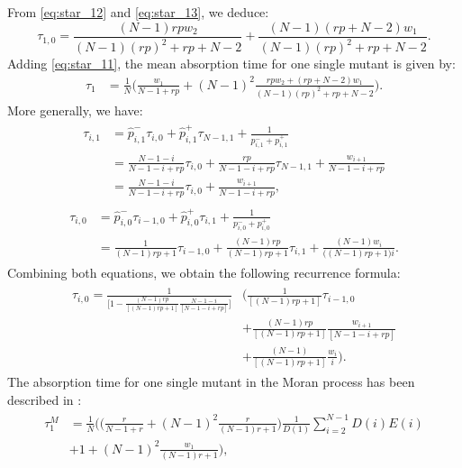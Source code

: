 \documentclass[a4paper,english,10pt]{amsart}
\theoremstyle{definition}
\numberwithin{equation}{section}
\begin{document}
%
From \eqref{eq:star_12} and \eqref{eq:star_13}, we deduce:
\[
  \tau_{1,0} = \frac{(N-1)rpw_2}{(N-1)(rp)^2 + rp + N-2} + \frac{(N-1)(rp+N-2)w_1}{(N-1)(rp)^2 + rp + N-2}.
\]
Adding \eqref{eq:star_11}, the mean absorption time for one single mutant is given by: 
\begin{align}
  \label{eq:ATstar}
 \tau_1 & = \frac{1}{N} \Big( \frac{w_1}{N-1+rp} + (N-1)^2 \frac{ rpw_2 + (rp+N-2)w_1}{(N-1)(rp)^2 + rp + N-2}\Big). 
\end{align}
More generally, we have: 
\begin{align} \label{eq:ATstar_i1}
\begin{split}
  \tau_{i,1} &= \hat p_{i,1}^- \tau_{i,0} 
                  + \hat p_{i,1}^+ \tau_{N-1,1} + 
			\frac{1}{p_{i,1}^- +p_{i,1}^+}   \\ 
             &= \frac{N-1-i}{N-1-i+rp}\tau_{i,0} 
                  + \frac{rp}{N-1-i+rp}\tau_{N-1,1} + \frac{w_{i+1}}{N-1-i+rp}   \\
             &= \frac{N-1-i}{N-1-i+rp}\tau_{i,0} + \frac{w_{i+1}}{N-1-i+rp},
\end{split}
\end{align}
\begin{align} \label{eq:ATstar_i0}
\begin{split}
\tau_{i,0} & = \hat p_{i,0}^- \tau_{i-1,0} 
                  + \hat p_{i,0}^+ \tau_{i,1} +  
	\frac{1}{p_{i,0}^- +p_{i,0}^+}   \\ 
             &= \frac{1}{(N-1)rp+1} \tau_{i-1,0} 
                  + \frac{(N-1)rp}{(N-1)rp+1}\tau_{i,1} + 
\frac{(N-1)w_i}{\big((N-1)rp+1\big)i}. 
\end{split}
\end{align}
Combining both equations, we obtain the following recurrence formula: 
\begin{align} \label{eq:ATrecurrent}
\begin{split}
\tau_{i,0} = \frac{\displaystyle 1}{\displaystyle
\Big[ 1 - \frac{(N-1)rp}{[(N-1)rp+1]}\frac{N-1-i}{[N-1-i+rp]} \Big]} 
&  \Big( \frac{1}{[(N-1)rp+1]} \tau_{i-1,0} \\
 & + \frac{(N-1)rp}{[(N-1)rp+1]}\frac{w_{i+1}}{[N-1-i+rp]}  \\
& + \frac{(N-1)}{[(N-1)rp+1]}\frac{w_i}{i}\Big). 
\end{split}
\end{align}
The absorption time for one single mutant in the Moran process has been described in \cite{H}: 
\begin{align} \label{eq:ATMoranstar}
\begin{split}
 \tau_1^M  & = \frac{1}{N} \Big( \big( \frac{r}{N-1+r} + (N-1)^2 \frac{r}{(N-1)r+1} \big)\frac{1}{D(1)}  \sum_{i=2}^{N-1} D(i)E(i)  \\
& + 1 + (N-1)^2 \frac{w_1}{(N-1)r + 1} \Big), 
\end{split}
\end{align}
\end{document}
